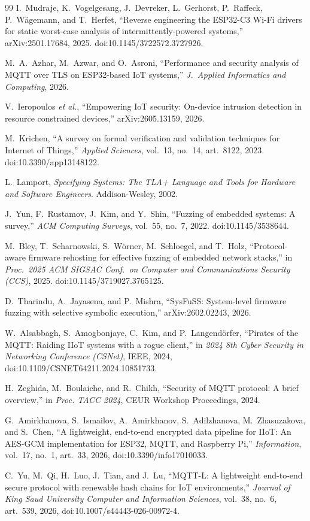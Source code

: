 \begin{thebibliography}{99}
 I.~Mudraje, K.~Vogelgesang, J.~Devreker, L.~Gerhorst, P.~Raffeck,
P.~W\"agemann, and T.~Herfet, ``Reverse engineering the ESP32-C3 Wi-Fi drivers for static
worst-case analysis of intermittently-powered systems,'' arXiv:2501.17684, 2025.
doi:10.1145/3722572.3727926.

 M.~A.~Azhar, M.~Azwar, and O.~Asroni, ``Performance and security analysis
of MQTT over TLS on ESP32-based IoT systems,'' \emph{J.\ Applied Informatics and Computing},
2026.

 V.~Ieropoulos \emph{et al.}, ``Empowering IoT security: On-device
intrusion detection in resource constrained devices,'' arXiv:2605.13159, 2026.

 M.~Krichen, ``A survey on formal verification and validation techniques for
Internet of Things,'' \emph{Applied Sciences}, vol.~13, no.~14, art.~8122, 2023.
doi:10.3390/app13148122.

 L.~Lamport, \emph{Specifying Systems: The TLA+ Language and Tools for
Hardware and Software Engineers}. Addison-Wesley, 2002.

 J.~Yun, F.~Rustamov, J.~Kim, and Y.~Shin, ``Fuzzing of embedded
systems: A survey,'' \emph{ACM Computing Surveys}, vol.~55, no.~7, 2022.
doi:10.1145/3538644.

 M.~Bley, T.~Scharnowski, S.~W\"orner, M.~Schloegel, and T.~Holz,
``Protocol-aware firmware rehosting for effective fuzzing of embedded network stacks,'' in
\emph{Proc.\ 2025 ACM SIGSAC Conf.\ on Computer and Communications Security (CCS)}, 2025.
doi:10.1145/3719027.3765125.

 D.~Tharindu, A.~Jayasena, and P.~Mishra, ``SysFuSS: System-level firmware
fuzzing with selective symbolic execution,'' arXiv:2602.02243, 2026.

 W.~Alsabbagh, S.~Amogbonjaye, C.~Kim, and P.~Langend\"orfer, ``Pirates of
the MQTT: Raiding IIoT systems with a rogue client,'' in \emph{2024 8th Cyber Security in
Networking Conference (CSNet)}, IEEE, 2024, doi:10.1109/CSNET64211.2024.10851733.

 H.~Zeghida, M.~Boulaiche, and R.~Chikh, ``Security of MQTT protocol: A
brief overview,'' in \emph{Proc. TACC 2024}, CEUR Workshop Proceedings, 2024.

 G.~Amirkhanova, S.~Ismailov, A.~Amirkhanov, S.~Adilzhanova,
M.~Zhasuzakova, and S.~Chen, ``A lightweight, end-to-end encrypted data pipeline for IIoT: An
AES-GCM implementation for ESP32, MQTT, and Raspberry Pi,'' \emph{Information}, vol.~17, no.~1,
art.~33, 2026, doi:10.3390/info17010033.

 C.~Yu, M.~Qi, H.~Luo, J.~Tian, and J.~Lu, ``MQTT-L: A lightweight
end-to-end secure protocol with renewable hash chains for IoT environments,'' \emph{Journal of
King Saud University Computer and Information Sciences}, vol.~38, no.~6, art.~539, 2026,
doi:10.1007/s44443-026-00972-4.

\end{thebibliography}


